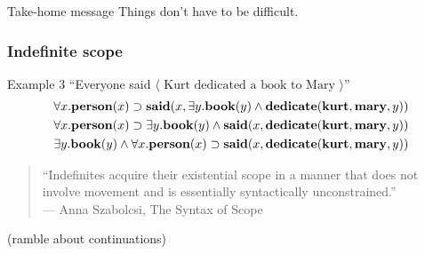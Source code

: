 \documentclass{beamer}
\begin{document}
\begin{frame}
  \begin{block}{Take-home message}
  Things don't have to be difficult.   
  \end{block}
\end{frame}

\begin{frame}[label=indefinite-scope]
  \frametitle{Indefinite scope}
  \vfill
  \begin{block}{Example 3}
    ``Everyone said $\langle \text{ Kurt dedicated a book to Mary } \rangle$''
    \vfill
    \begin{gather*}
      \forall{x}.\mathbf{person}(x)\supset\mathbf{said}(x,\exists{y}.\mathbf{book}(y)
      \wedge\mathbf{dedicate}(\mathbf{kurt},\mathbf{mary},y))
      \\
      \forall{x}.\mathbf{person}(x)\supset\exists{y}.\mathbf{book}(y)
      \wedge\mathbf{said}(x,\mathbf{dedicate}(\mathbf{kurt},\mathbf{mary},y))
      \\
      \exists{y}.\mathbf{book}(y)
      \wedge\forall{x}.\mathbf{person}(x)\supset\mathbf{said}(x,\mathbf{dedicate}(\mathbf{kurt},\mathbf{mary},y))
    \end{gather*}
  \end{block}
  \vfill
\end{frame}

\begin{frame}
  \begin{quote}
    ``Indefinites acquire their existential scope in a manner that does not
    involve movement and is essentially syntactically unconstrained.''\\
    \hfill --- Anna Szabolcsi, The Syntax of Scope
  \end{quote}
\end{frame}


\begin{frame}
  \centering
  (ramble about continuations)
\end{frame}
\end{document}
